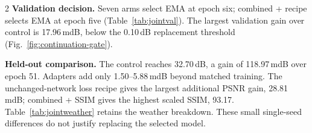 \medskip
\noindent\begin{minipage}{\linewidth}
\centering{}
\label{fig:continuation-gate}
\end{minipage}
\medskip

\begin{multicols}{2}\raggedcolumns
\textbf{Validation decision.} Seven arms select EMA at epoch six; combined
+ recipe selects EMA at epoch five (Table~\ref{tab:jointval}). The largest
validation gain over control is 17.96\,mdB, below the 0.10\,dB replacement
threshold (Fig.~\ref{fig:continuation-gate}).

\textbf{Held-out comparison.} The control reaches 32.70\,dB, a gain of
118.97\,mdB over epoch 51. Adapters add only 1.50--5.88\,mdB beyond matched
training. The unchanged-network loss recipe gives the largest additional
PSNR gain, 28.81\,mdB; combined + SSIM gives the highest scaled SSIM, 93.17.
Table~\ref{tab:jointweather} retains the weather breakdown. These small
single-seed differences do not justify replacing the selected model.
\end{multicols}
\clearpage
